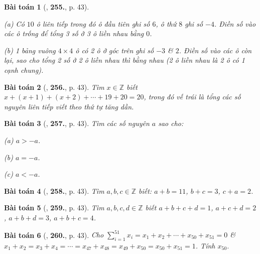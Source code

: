 \documentclass{article}
\numberwithin{equation}{section}
\newtheorem{baitoan}{Bài toán}
\begin{document}
\begin{baitoan}[\cite{Binh_Toan_6_tap_1}, \textbf{255.}, p. 43]
	\begin{enumerate*}
		\item[(a)] Có $10$ ô liên tiếp trong đó ô đầu tiên ghi số $6$, ô thứ $8$ ghi số $-4$. Điền số vào các ô trống để tổng 3 số ở 3 ô liền nhau bằng $0$.
		\item[(b)] 1 bảng vuông $4\times 4$ ô có 2 ô ở góc trên ghi số $-3$ \& $2$. Điền số vào các ô còn lại, sao cho tổng 2 số ở 2 ô liền nhau thì bằng nhau (2 ô liền nhau là 2 ô có 1 cạnh chung).
	\end{enumerate*}
\end{baitoan}

\begin{baitoan}[\cite{Binh_Toan_6_tap_1}, \textbf{256.}, p. 43]
	Tìm $x\in\mathbb{Z}$ biết $x + (x + 1) + (x + 2) + \cdots + 19 + 20 = 20$, trong đó vế trái là tổng các số nguyên liên tiếp viết theo thứ tự tăng dần.
\end{baitoan}

\begin{baitoan}[\cite{Binh_Toan_6_tap_1}, \textbf{257.}, p. 43]
	Tìm các số nguyên $a$ sao cho:
	\begin{enumerate*}
		\item[(a)] $a > -a$.
		\item[(b)] $a = -a$.
		\item[(c)] $a < -a$.
	\end{enumerate*}
\end{baitoan}

\begin{baitoan}[\cite{Binh_Toan_6_tap_1}, \textbf{258.}, p. 43]
	Tìm $a,b,c\in\mathbb{Z}$ biết: $a + b = 11$, $b + c = 3$, $c + a = 2$.
\end{baitoan}

\begin{baitoan}[\cite{Binh_Toan_6_tap_1}, \textbf{259.}, p. 43]
	Tìm $a,b,c,d\in\mathbb{Z}$ biết $a + b + c + d = 1$, $a + c + d = 2$, $a + b + d = 3$, $a + b + c = 4$.
\end{baitoan}

\begin{baitoan}[\cite{Binh_Toan_6_tap_1}, \textbf{260.}, p. 43]
	Cho $\sum_{i=1}^{51} x_i = x_1 + x_2 + \cdots + x_{50} + x_{51} = 0$ \& $x_1 + x_2 = x_3 + x_4 = \cdots = x_{47} + x_{48} = x_{49} + x_{50} = x_{50} + x_{51} = 1$. Tính $x_{50}$.
\end{baitoan}

\end{document}
